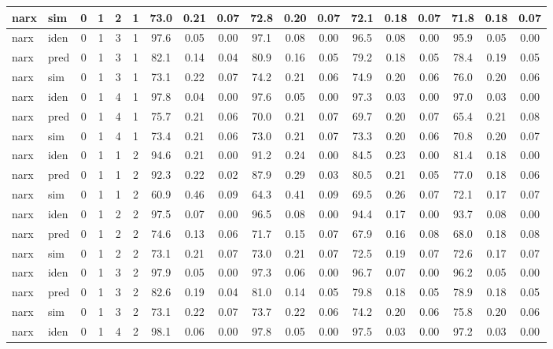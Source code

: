 \begin{landscape}
\begin{center}
\begin{longtable}{ll|cccc|ccc|ccc|ccc|ccc}
narx & sim  & 0 & 1 & 2 & 1 & 73.0 & 0.21 & 0.07 & 72.8 & 0.20 & 0.07 & 72.1 & 0.18 & 0.07 & 71.8 & 0.18 & 0.07 \\ 
 \hline 
narx & iden & 0 & 1 & 3 & 1 & 97.6 & 0.05 & 0.00 & 97.1 & 0.08 & 0.00 & 96.5 & 0.08 & 0.00 & 95.9 & 0.05 & 0.00 \\ 
narx & pred & 0 & 1 & 3 & 1 & 82.1 & 0.14 & 0.04 & 80.9 & 0.16 & 0.05 & 79.2 & 0.18 & 0.05 & 78.4 & 0.19 & 0.05 \\ 
narx & sim  & 0 & 1 & 3 & 1 & 73.1 & 0.22 & 0.07 & 74.2 & 0.21 & 0.06 & 74.9 & 0.20 & 0.06 & 76.0 & 0.20 & 0.06 \\ 
 \hline 
narx & iden & 0 & 1 & 4 & 1 & 97.8 & 0.04 & 0.00 & 97.6 & 0.05 & 0.00 & 97.3 & 0.03 & 0.00 & 97.0 & 0.03 & 0.00 \\ 
narx & pred & 0 & 1 & 4 & 1 & 75.7 & 0.21 & 0.06 & 70.0 & 0.21 & 0.07 & 69.7 & 0.20 & 0.07 & 65.4 & 0.21 & 0.08 \\ 
narx & sim  & 0 & 1 & 4 & 1 & 73.4 & 0.21 & 0.06 & 73.0 & 0.21 & 0.07 & 73.3 & 0.20 & 0.06 & 70.8 & 0.20 & 0.07 \\ 
 \hline 
narx & iden & 0 & 1 & 1 & 2 & 94.6 & 0.21 & 0.00 & 91.2 & 0.24 & 0.00 & 84.5 & 0.23 & 0.00 & 81.4 & 0.18 & 0.00 \\ 
narx & pred & 0 & 1 & 1 & 2 & 92.3 & 0.22 & 0.02 & 87.9 & 0.29 & 0.03 & 80.5 & 0.21 & 0.05 & 77.0 & 0.18 & 0.06 \\ 
narx & sim  & 0 & 1 & 1 & 2 & 60.9 & 0.46 & 0.09 & 64.3 & 0.41 & 0.09 & 69.5 & 0.26 & 0.07 & 72.1 & 0.17 & 0.07 \\ 
 \hline 
narx & iden & 0 & 1 & 2 & 2 & 97.5 & 0.07 & 0.00 & 96.5 & 0.08 & 0.00 & 94.4 & 0.17 & 0.00 & 93.7 & 0.08 & 0.00 \\ 
narx & pred & 0 & 1 & 2 & 2 & 74.6 & 0.13 & 0.06 & 71.7 & 0.15 & 0.07 & 67.9 & 0.16 & 0.08 & 68.0 & 0.18 & 0.08 \\ 
narx & sim  & 0 & 1 & 2 & 2 & 73.1 & 0.21 & 0.07 & 73.0 & 0.21 & 0.07 & 72.5 & 0.19 & 0.07 & 72.6 & 0.17 & 0.07 \\ 
 \hline 
narx & iden & 0 & 1 & 3 & 2 & 97.9 & 0.05 & 0.00 & 97.3 & 0.06 & 0.00 & 96.7 & 0.07 & 0.00 & 96.2 & 0.05 & 0.00 \\ 
narx & pred & 0 & 1 & 3 & 2 & 82.6 & 0.19 & 0.04 & 81.0 & 0.14 & 0.05 & 79.8 & 0.18 & 0.05 & 78.9 & 0.18 & 0.05 \\ 
narx & sim  & 0 & 1 & 3 & 2 & 73.1 & 0.22 & 0.07 & 73.7 & 0.22 & 0.06 & 74.2 & 0.20 & 0.06 & 75.8 & 0.20 & 0.06 \\ 
 \hline 
narx & iden & 0 & 1 & 4 & 2 & 98.1 & 0.06 & 0.00 & 97.8 & 0.05 & 0.00 & 97.5 & 0.03 & 0.00 & 97.2 & 0.03 & 0.00 \\ 

\end{longtable}
\end{center}
\end{landscape}
